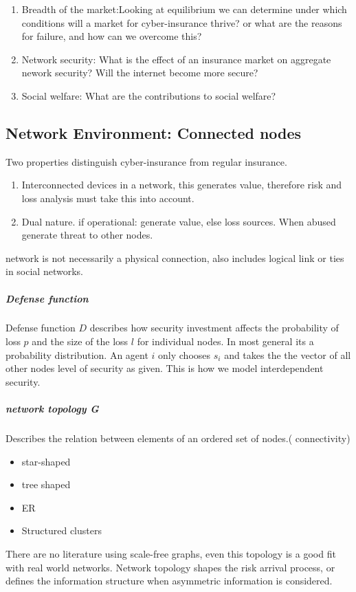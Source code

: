 \begin{enumerate}
\item Breadth of the market:Looking at equilibrium we can determine under which conditions will a market for
 cyber-insurance thrive? or what are the reasons for failure, and how can we overcome this?
\item Network security: What is the effect of an insurance market on aggregate nework security? Will the internet become more secure?
\item Social welfare: What are the contributions to social welfare?

\end{enumerate}

\subsection{Network Environment: Connected nodes}
Two properties distinguish cyber-insurance from regular insurance.
\begin{enumerate}
\item Interconnected devices in a network, this generates value, therefore risk and loss analysis must take this into account. 
\item Dual nature. if operational: generate value, else loss sources. When abused generate threat to other nodes.
\end{enumerate}
network is not necessarily  a physical connection, also includes logical link or ties in social networks.
\subparagraph{Defense function}
Defense function $D$ describes how security investment affects the probability of loss $p $ and the size of the loss  $l $ for individual nodes.  In most general its a probability distribution.
An agent $i$ only chooses $s_{i}$ 
and takes the the vector of all other nodes level of security as given. 
This is how we model interdependent security. 

\subparagraph{network topology G}
Describes the relation between elements of an ordered set of nodes.( connectivity)
\begin{itemize}[topsep=-1em,parsep=0em,itemsep=0em] 
\item star-shaped \item tree shaped \item ER \item Structured clusters
\end{itemize}
There are no literature using scale-free graphs, even this topology is a good fit with real world networks.
Network topology shapes the risk arrival process, or defines the information structure when asymmetric
 information is considered.

